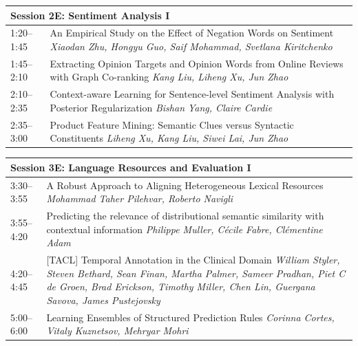 \documentclass{book}
\renewcommand{\large}{\fontsize{36}{40}\selectfont}
\begin{document}
\begin{tabular}{p{3in}p{16in}}
  \multicolumn{2}{l}{\bfseries\large Session 2E: Sentiment Analysis I} \\\hline

    
    1:20--1:45
    &	An Empirical Study on the Effect of Negation Words on Sentiment \newline 
    {\itshape Xiaodan Zhu, Hongyu Guo, Saif Mohammad, Svetlana Kiritchenko} \\
    
    1:45--2:10
    &	Extracting Opinion Targets and Opinion Words from Online Reviews with Graph Co-ranking \newline 
    {\itshape Kang Liu, Liheng Xu, Jun Zhao} \\
    
    2:10--2:35
    &	Context-aware Learning for Sentence-level Sentiment Analysis with Posterior Regularization \newline 
    {\itshape Bishan Yang, Claire Cardie} \\
    
    2:35--3:00
    &	Product Feature Mining: Semantic Clues versus Syntactic Constituents \newline 
    {\itshape Liheng Xu, Kang Liu, Siwei Lai, Jun Zhao} \\
    
\end{tabular}

\begin{tabular}{p{3in}p{16in}}
  \multicolumn{2}{l}{\bfseries\large Session 3E: Language Resources and Evaluation I} \\\hline

    
    3:30--3:55
    &	A Robust Approach to Aligning Heterogeneous Lexical Resources \newline 
    {\itshape Mohammad Taher Pilehvar, Roberto Navigli} \\
    
    3:55--4:20
    &	Predicting the relevance of distributional semantic similarity with contextual information \newline 
    {\itshape Philippe Muller, Cécile Fabre, Clémentine Adam} \\
    
    4:20--4:45
    &	[TACL] Temporal Annotation in the Clinical Domain \newline 
    {\itshape William Styler, Steven Bethard, Sean Finan, Martha Palmer, Sameer Pradhan, Piet C de Groen, Brad Erickson, Timothy Miller, Chen Lin, Guergana Savova, James Pustejovsky} \\
    
    5:00--6:00
    &	Learning Ensembles of Structured Prediction Rules \newline 
    {\itshape Corinna Cortes, Vitaly Kuznetsov, Mehryar Mohri} \\
    
\end{tabular}
\end{document}
